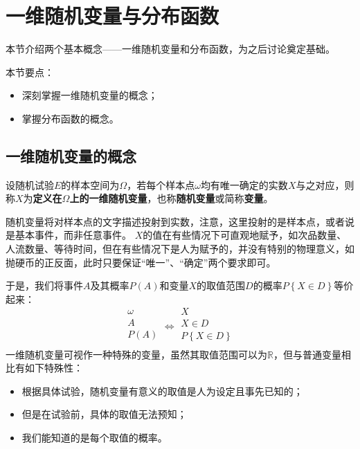 \section{一维随机变量与分布函数}

本节介绍两个基本概念——一维随机变量和分布函数，为之后讨论奠定基础。

本节要点：
\begin{itemize}
    \item 深刻掌握一维随机变量的概念；
    \item 掌握分布函数的概念。
\end{itemize}

\subsection{一维随机变量的概念}

\begin{definition}[一维随机变量]
设随机试验$E$的样本空间为$\varOmega $，若每个样本点$\omega$均有唯一确定的实数$X$与之对应，则称$X$为{\bf 定义在$\varOmega $上的一维随机变量}，也称{\bf 随机变量}或简称{\bf 变量}。
\end{definition}

随机变量将对样本点的文字描述投射到实数，注意，这里投射的是样本点，或者说是基本事件，而非任意事件。
$X$的值在有些情况下可直观地赋予，如次品数量、人流数量、等待时间，但在有些情况下是人为赋予的，并没有特别的物理意义，如抛硬币的正反面，此时只要保证“唯一”、“确定”两个要求即可。

于是，我们将事件$A$及其概率$P\left( A \right) $和变量$X$的取值范围$D$的概率$P\left\{ X\in D \right\} $等价起来：
\[
\begin{array}{l}
	\omega\\
	A\\
	P\left( A \right)\\
\end{array}\Leftrightarrow \begin{array}{l}
	X\\
	X\in D\\
	P\left\{ X\in D \right\}\\
\end{array}
\]
一维随机变量可视作一种特殊的变量，虽然其取值范围可以为$\mathbb{R} $，但与普通变量相比有如下特殊性：
\begin{itemize}
    \item 根据具体试验，随机变量有意义的取值是人为设定且事先已知的；
    \item 但是在试验前，具体的取值无法预知；
    \item 我们能知道的是每个取值的概率。
\end{itemize}

